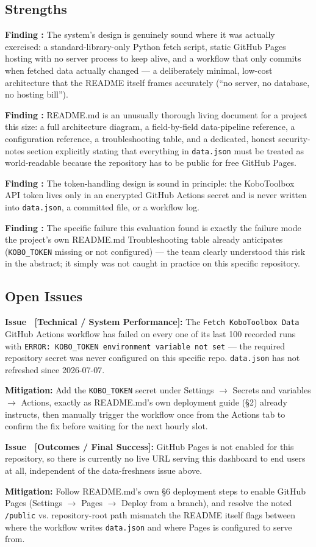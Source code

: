 \documentclass[12pt, a4paper]{article}
\newcounter{finding}
\newcommand{\finding}[1]{%
  \stepcounter{finding}%
  \begin{mdframed}[style=greenbox]
  \textbf{Finding \thefinding:} #1
  \end{mdframed}%
}
\newcounter{issue}
\newcommand{\issuelabel}[2]{%
  \stepcounter{issue}%
  \begin{mdframed}[style=alertbox]
  \textbf{Issue \theissue\ [\textcolor{ehaRed}{#1}]:} #2
  \end{mdframed}%
}
\newcommand{\mitigation}[1]{%
  \begin{mdframed}[style=mitigbox]
  \textbf{\textcolor{ehaBlue}{Mitigation:}} #1
  \end{mdframed}%
}
\begin{document}
\subsection{Strengths}

\finding{The system's design is genuinely sound where it was actually exercised: a standard-library-only Python fetch script, static GitHub Pages hosting with no server process to keep alive, and a workflow that only commits when fetched data actually changed --- a deliberately minimal, low-cost architecture that the README itself frames accurately (``no server, no database, no hosting bill'').}
\finding{README.md is an unusually thorough living document for a project this size: a full architecture diagram, a field-by-field data-pipeline reference, a configuration reference, a troubleshooting table, and a dedicated, honest security-notes section explicitly stating that everything in \texttt{data.json} must be treated as world-readable because the repository has to be public for free GitHub Pages.}
\finding{The token-handling design is sound in principle: the KoboToolbox API token lives only in an encrypted GitHub Actions secret and is never written into \texttt{data.json}, a committed file, or a workflow log.}
\finding{The specific failure this evaluation found is exactly the failure mode the project's own README.md Troubleshooting table already anticipates (\texttt{KOBO\_TOKEN} missing or not configured) --- the team clearly understood this risk in the abstract; it simply was not caught in practice on this specific repository.}

\subsection{Open Issues}

\issuelabel{Technical / System Performance}{The \texttt{Fetch KoboToolbox Data} GitHub Actions workflow has failed on every one of its last 100 recorded runs with \texttt{ERROR: KOBO\_TOKEN environment variable not set} --- the required repository secret was never configured on this specific repo. \texttt{data.json} has not refreshed since 2026-07-07.}
\mitigation{Add the \texttt{KOBO\_TOKEN} secret under Settings $\to$ Secrets and variables $\to$ Actions, exactly as README.md's own deployment guide (\S2) already instructs, then manually trigger the workflow once from the Actions tab to confirm the fix before waiting for the next hourly slot.}

\issuelabel{Outcomes / Final Success}{GitHub Pages is not enabled for this repository, so there is currently no live URL serving this dashboard to end users at all, independent of the data-freshness issue above.}
\mitigation{Follow README.md's own \S6 deployment steps to enable GitHub Pages (Settings $\to$ Pages $\to$ Deploy from a branch), and resolve the noted \texttt{/public} vs. repository-root path mismatch the README itself flags between where the workflow writes \texttt{data.json} and where Pages is configured to serve from.}
\end{document}

